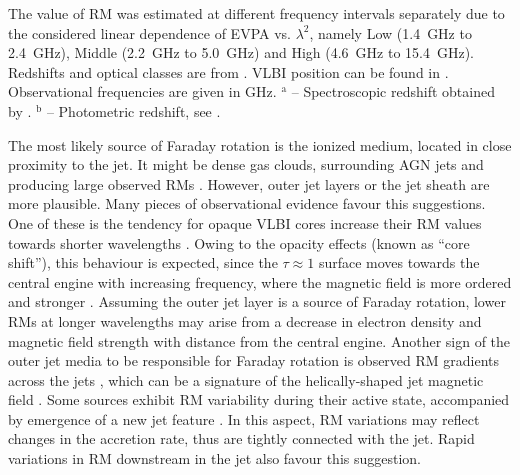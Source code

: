 \documentclass[a4paper,fleqn,usenatbib,useAMS]{mnras}
\begin{document}
\begin{table*}
\begin{minipage}{175mm}
The value of RM was estimated at different frequency intervals separately due to the considered linear dependence of EVPA vs. $\lambda^2$, namely Low (1.4~GHz to 2.4~GHz), Middle (2.2~GHz to 5.0~GHz) and High (4.6~GHz to 15.4~GHz).
Redshifts and optical classes are from \citet{veron_veron_10}. VLBI position can be found in \citet{sokolovsky_etal11}. 
Observational frequencies are given in GHz.
$^\mathrm{a}$ -- Spectroscopic redshift obtained by \citet{afanasiev_etal03}. $^\mathrm{b}$ -- Photometric redshift, see \citet{finke_etal08}.
\label{t_1}
\end{minipage}
\end{table*}

The most likely source of Faraday rotation is the ionized medium, located in close proximity to the jet. 
It might be dense gas clouds, surrounding AGN jets and producing large observed RMs \citep{1999MNRAS.308..955J,2010AA...518A..33M}.
However, outer jet layers \citep{zavala_taylor_04} or the jet sheath \citep{asada_etal02,2007ApJ...662..835M} are more plausible. 
Many pieces of observational evidence favour this suggestions. 
One of these is the tendency for opaque VLBI cores increase their RM values towards shorter wavelengths \citep[e.g.][]{zavala_taylor_04,jorstad_etal07,osullivan_gabuzda_09,algaba13}. 
Owing to the opacity effects (known as ``core shift''), this behaviour is expected, since the $\tau\approx1$ surface moves towards the central engine with increasing frequency, where the magnetic field is more ordered and stronger \citep{2011MNRAS.418L..79T,zamaninasab_etal14}. 
Assuming the outer jet layer is a source of Faraday rotation, lower RMs at longer wavelengths may arise from a decrease in electron density and magnetic field strength with distance from the central engine.
Another sign of the outer jet media to be responsible for Faraday rotation is observed RM gradients across the jets \citep{asada_etal02,2008ApJ...681L..69G,osullivan_gabuzda_09,zamaninasab_etal13}, which can be a signature of the helically-shaped jet magnetic field \citep{blandford93,broderick_mckinney_10}.
Some sources exhibit RM variability during their active state, accompanied by emergence of a new jet feature \citep{taylor_00,lico_etal14,giroletti_etal15,2016MNRAS.462.2747K}. 
In this aspect, RM variations may reflect changes in the accretion rate, thus are tightly connected with the jet.
Rapid variations in RM downstream in the jet \citep{asada_etal08} also favour this suggestion.
\end{document}

